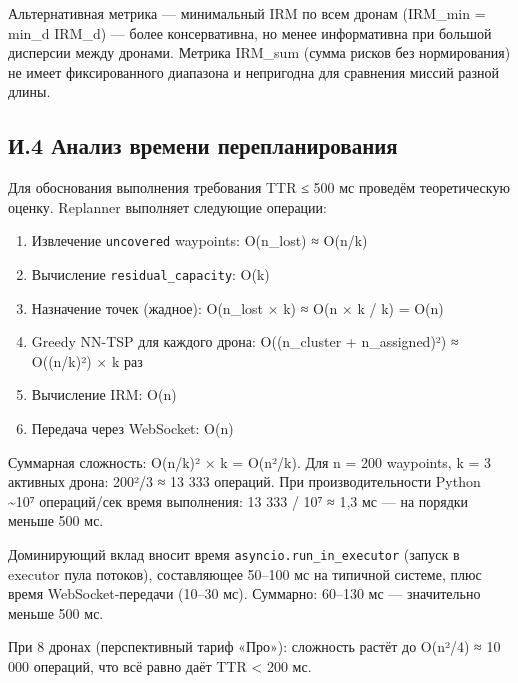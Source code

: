 \documentclass[14pt,a4paper]{extarticle}
\providecommand{\tightlist}{%
  \setlength{\itemsep}{0pt}\setlength{\parskip}{0pt}}
\begin{document}
Альтернативная метрика --- минимальный IRM по всем дронам (IRM\_min = min\_d IRM\_d) --- более консервативна, но менее информативна при большой дисперсии между дронами. Метрика IRM\_sum (сумма рисков без нормирования) не имеет фиксированного диапазона и непригодна для сравнения миссий разной длины.

\hypertarget{ux438.4-ux430ux43dux430ux43bux438ux437-ux432ux440ux435ux43cux435ux43dux438-ux43fux435ux440ux435ux43fux43bux430ux43dux438ux440ux43eux432ux430ux43dux438ux44f}{%
\subsection{И.4 Анализ времени перепланирования}\label{ux438.4-ux430ux43dux430ux43bux438ux437-ux432ux440ux435ux43cux435ux43dux438-ux43fux435ux440ux435ux43fux43bux430ux43dux438ux440ux43eux432ux430ux43dux438ux44f}}

Для обоснования выполнения требования TTR ≤ 500 мс проведём теоретическую оценку. Replanner выполняет следующие операции:

\begin{enumerate}
\def\labelenumi{\arabic{enumi}.}
\tightlist
\item
  Извлечение \texttt{uncovered} waypoints: O(n\_lost) ≈ O(n/k)
\item
  Вычисление \texttt{residual\_capacity}: O(k)
\item
  Назначение точек (жадное): O(n\_lost × k) ≈ O(n × k / k) = O(n)
\item
  Greedy NN-TSP для каждого дрона: O((n\_cluster + n\_assigned)²) ≈ O((n/k)²) × k раз
\item
  Вычисление IRM: O(n)
\item
  Передача через WebSocket: O(n)
\end{enumerate}

Суммарная сложность: O(n/k)² × k = O(n²/k). Для n = 200 waypoints, k = 3 активных дрона: 200²/3 ≈ 13 333 операций. При производительности Python \textasciitilde10⁷ операций/сек время выполнения: 13 333 / 10⁷ ≈ 1,3 мс --- на порядки меньше 500 мс.

Доминирующий вклад вносит время \texttt{asyncio.run\_in\_executor} (запуск в executor пула потоков), составляющее 50--100 мс на типичной системе, плюс время WebSocket-передачи (10--30 мс). Суммарно: 60--130 мс --- значительно меньше 500 мс.

При 8 дронах (перспективный тариф «Про»): сложность растёт до O(n²/4) ≈ 10 000 операций, что всё равно даёт TTR \textless{} 200 мс.
\end{document}
